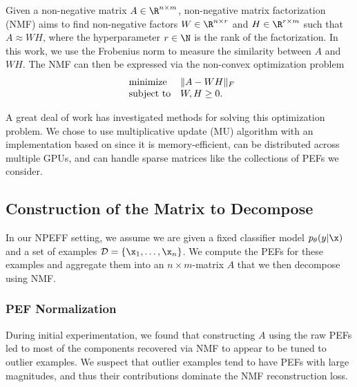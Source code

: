 \documentclass[dvipsnames]{article}
\begin{document}
Given a non-negative matrix $A \in \R^{n\times m}$, non-negative matrix factorization (NMF) aims to find non-negative factors $W \in \R^{n\times r}$ and $H \in \R^{r\times m}$ such that $A \approx WH$, where the hyperparameter $r\in\N$ is the rank of the factorization.
In this work, we use the Frobenius norm to measure the similarity between $A$ and $WH$.
The NMF can then be expressed via the non-convex optimization problem
\begin{equation}\label{eq:nmf_nc_opt}
\begin{array}{ll@{}ll}
\text{minimize}  & \|A - WH\|_F \\
\text{subject to} & W,H \geq 0. \\
\end{array}
\end{equation}

A great deal of work has investigated methods for solving this optimization problem. %
We chose to use multiplicative update (MU) algorithm with an implementation based on \citet{boureima2022distributed} since it is memory-efficient, can be distributed across multiple GPUs, and can handle sparse matrices like the collections of PEFs we consider.
% 


\subsection{Construction of the Matrix to Decompose}
In our NPEFF setting, we assume we are given a fixed classifier model $p_\theta(y|\x)$ and a set of examples $\mathcal D = \{\x_1,\dotsc,\x_n\}$.
We compute the PEFs for these examples and aggregate them into an $n \times m$-matrix $A$ that we then decompose using NMF.

\subsubsection{PEF Normalization}
During initial experimentation, we found that constructing $A$ using the raw PEFs led to most of the components recovered via NMF to appear to be tuned to outlier examples.
We suspect that outlier examples tend to have PEFs with large magnitudes, and thus their contributions dominate the NMF reconstruction loss.
\end{document}
